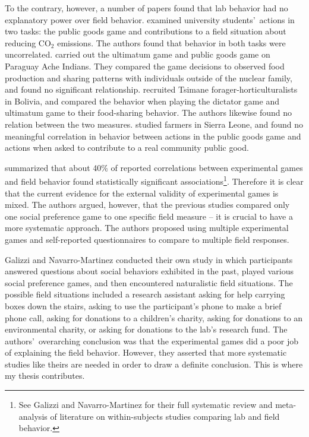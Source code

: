 \documentclass[12pt]{article}
\begin{document}
To the contrary, however, a number of papers found that lab behavior had no explanatory power over field behavior. \cite{goeschl_2015} examined university students\rq \ actions in two tasks: the public goods game and contributions to a field situation about reducing CO$_{2}$ emissions. The authors found that behavior in both tasks were uncorrelated. \cite{hill_gurven_2004} carried out the ultimatum game and public goods game on Paraguay Ache Indians. They compared the game decisions to observed food production and sharing patterns with individuals outside of the nuclear family, and found no significant relationship. \cite{gurven_winking_2008} recruited Tsimane forager-horticulturalists in Bolivia, and compared the behavior when playing the dictator game and ultimatum game to their food-sharing behavior. The authors likewise found no relation between the two measures. \cite{voors_2012} studied farmers in Sierra Leone, and found no meaningful correlation in behavior between actions in the public goods game and actions when asked to contribute to a real community public good.

\cite{galizzi_navarro-martinez_2017} summarized that about 40\% of reported correlations between experimental games and field behavior found statistically significant associations\footnote{See Galizzi and Navarro-Martinez for their full systematic review and meta-analysis of literature on within-subjects studies comparing lab and field behavior.}. Therefore it is clear that the current evidence for the external validity of experimental games is mixed. The authors argued, however, that the previous studies compared only one social preference game to one specific field measure -- it is crucial to have a more systematic approach. The authors proposed using multiple experimental games and self-reported questionnaires to compare to multiple field responses. 

Galizzi and Navarro-Martinez conducted their own study in which participants answered questions about social behaviors exhibited in the past, played various social preference games, and then encountered naturalistic field situations. The possible field situations included a research assistant asking for help carrying boxes down the stairs, asking to use the participant\rq s phone to make a brief phone call, asking for donations to a children\rq s charity, asking for donations to an environmental charity, or asking for donations to the lab\rq s research fund.  The authors\rq \ overarching conclusion was that the experimental games did a poor job of explaining the field behavior. However, they asserted that more systematic studies like theirs are needed in order to draw a definite conclusion. This is where my thesis contributes.
\end{document}
